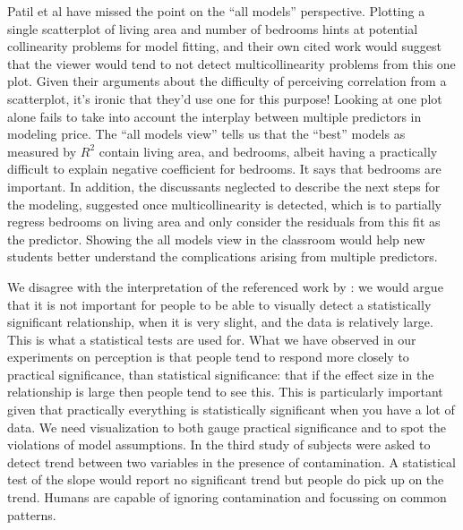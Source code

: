 \documentclass[preprint]{imsart}
\begin{document}
Patil et al have missed the point on the ``all models'' perspective. Plotting a single scatterplot of living area and number of bedrooms hints at potential collinearity problems for model fitting, and their own cited work would suggest that the viewer would tend to not detect multicollinearity problems from this one plot. Given their arguments about the difficulty of perceiving correlation from a scatterplot, it's ironic that they'd use one for this purpose!  Looking at one plot alone fails to take into account the interplay between multiple predictors in modeling price. The ``all models view'' tells us that the ``best'' models as measured by $R^2$ contain living area, and bedrooms, albeit having a practically difficult to explain negative coefficient for bedrooms. It says that bedrooms are important. In addition, the discussants neglected to describe the next steps for the modeling, suggested once multicollinearity is detected, which is to partially regress bedrooms on living area and only consider the residuals from this fit as the predictor. Showing the all models view in the classroom would help new students better understand the complications arising from multiple predictors.

We disagree with the interpretation of the referenced work by \cite{Fisher}: we would argue that it is not important for people to be able to visually detect a statistically significant relationship, when it is very slight, and the data is relatively large. This is what a statistical tests are used for. What we have observed in our experiments on perception is that people tend to respond more closely to practical significance, than statistical significance: that if the effect size in the relationship is large then people tend to see this. This is particularly important given that practically everything is statistically significant when you have a lot of data. We need visualization to both gauge practical significance and to spot the violations of model assumptions. In the third study of \cite{majumder:2013} subjects were asked to detect trend between two variables in the presence of contamination. A statistical test of the slope would report no significant trend but people do pick up on the trend. Humans are capable of ignoring contamination and focussing on common patterns.

\end{document}
